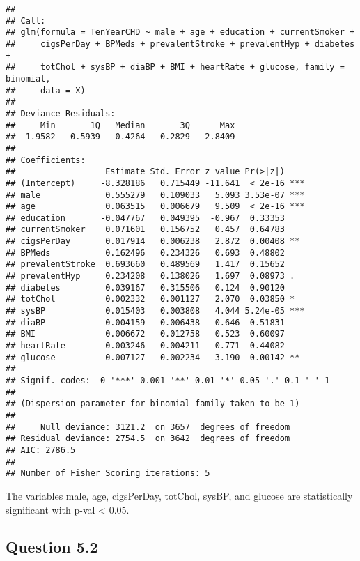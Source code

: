 \documentclass[
]{article}
\begin{document}
\begin{verbatim}
## 
## Call:
## glm(formula = TenYearCHD ~ male + age + education + currentSmoker + 
##     cigsPerDay + BPMeds + prevalentStroke + prevalentHyp + diabetes + 
##     totChol + sysBP + diaBP + BMI + heartRate + glucose, family = binomial, 
##     data = X)
## 
## Deviance Residuals: 
##     Min       1Q   Median       3Q      Max  
## -1.9582  -0.5939  -0.4264  -0.2829   2.8409  
## 
## Coefficients:
##                  Estimate Std. Error z value Pr(>|z|)    
## (Intercept)     -8.328186   0.715449 -11.641  < 2e-16 ***
## male             0.555279   0.109033   5.093 3.53e-07 ***
## age              0.063515   0.006679   9.509  < 2e-16 ***
## education       -0.047767   0.049395  -0.967  0.33353    
## currentSmoker    0.071601   0.156752   0.457  0.64783    
## cigsPerDay       0.017914   0.006238   2.872  0.00408 ** 
## BPMeds           0.162496   0.234326   0.693  0.48802    
## prevalentStroke  0.693660   0.489569   1.417  0.15652    
## prevalentHyp     0.234208   0.138026   1.697  0.08973 .  
## diabetes         0.039167   0.315506   0.124  0.90120    
## totChol          0.002332   0.001127   2.070  0.03850 *  
## sysBP            0.015403   0.003808   4.044 5.24e-05 ***
## diaBP           -0.004159   0.006438  -0.646  0.51831    
## BMI              0.006672   0.012758   0.523  0.60097    
## heartRate       -0.003246   0.004211  -0.771  0.44082    
## glucose          0.007127   0.002234   3.190  0.00142 ** 
## ---
## Signif. codes:  0 '***' 0.001 '**' 0.01 '*' 0.05 '.' 0.1 ' ' 1
## 
## (Dispersion parameter for binomial family taken to be 1)
## 
##     Null deviance: 3121.2  on 3657  degrees of freedom
## Residual deviance: 2754.5  on 3642  degrees of freedom
## AIC: 2786.5
## 
## Number of Fisher Scoring iterations: 5
\end{verbatim}

The variables male, age, cigsPerDay, totChol, sysBP, and glucose are
statistically significant with p-val \textless{} 0.05.

\hypertarget{question-5.2}{%
\subsection{Question 5.2}\label{question-5.2}}
\end{document}
